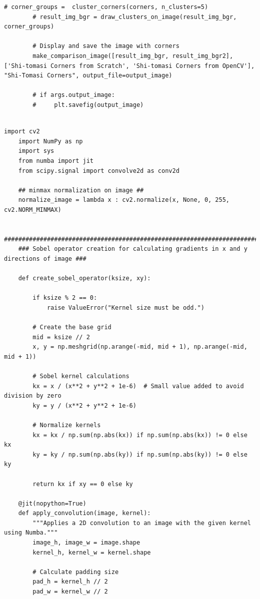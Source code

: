 \documentclass[11pt, conference, letterpaper]{IEEEtran}
\begin{document}
\begin{lstlisting}[style=python, caption={\texttt{shi\_tomasi\_corners.py}}, label={lst:stc}]
        # corner_groups =  cluster_corners(corners, n_clusters=5)
        # result_img_bgr = draw_clusters_on_image(result_img_bgr, corner_groups)
    
        # Display and save the image with corners
        make_comparison_image([result_img_bgr, result_img_bgr2], ['Shi-tomasi Corners from Scratch', 'Shi-tomasi Corners from OpenCV'], "Shi-Tomasi Corners", output_file=output_image)
        
        # if args.output_image:
        #     plt.savefig(output_image)
            
\end{lstlisting}

\begin{lstlisting}[style=python, caption={\texttt{image\_utils.py}}, label={lst:iutils}]
    import cv2
    import NumPy as np
    import sys
    from numba import jit
    from scipy.signal import convolve2d as conv2d
    
    ## minmax normalization on image ##
    normalize_image = lambda x : cv2.normalize(x, None, 0, 255, cv2.NORM_MINMAX)
    
    ##########################################################################################
    ### Sobel operator creation for calculating gradients in x and y directions of image ###
    
    def create_sobel_operator(ksize, xy):

        if ksize % 2 == 0:
            raise ValueError("Kernel size must be odd.")
        
        # Create the base grid
        mid = ksize // 2
        x, y = np.meshgrid(np.arange(-mid, mid + 1), np.arange(-mid, mid + 1))
        
        # Sobel kernel calculations
        kx = x / (x**2 + y**2 + 1e-6)  # Small value added to avoid division by zero
        ky = y / (x**2 + y**2 + 1e-6)
        
        # Normalize kernels
        kx = kx / np.sum(np.abs(kx)) if np.sum(np.abs(kx)) != 0 else kx
        ky = ky / np.sum(np.abs(ky)) if np.sum(np.abs(ky)) != 0 else ky
        
        return kx if xy == 0 else ky

    @jit(nopython=True)
    def apply_convolution(image, kernel):
        """Applies a 2D convolution to an image with the given kernel using Numba."""
        image_h, image_w = image.shape
        kernel_h, kernel_w = kernel.shape
        
        # Calculate padding size
        pad_h = kernel_h // 2
        pad_w = kernel_w // 2
        

\end{lstlisting}
\end{document}
